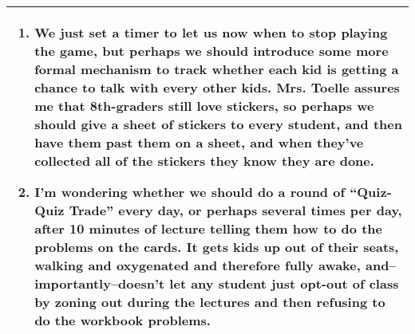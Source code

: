\begin{small}
\begin{tabularx}{\linewidth}{|X|}
{\begin{enumerate}
    \item We just set a timer to let us now when to stop playing the
      game, but perhaps we should introduce some more formal mechanism
      to track whether each kid is getting a chance to talk with every
      other kids.  Mrs. Toelle assures me that 8th-graders still love
      stickers, so perhaps we should give a sheet of stickers to every
      student, and then have them past them on a sheet, and when
      they've collected all of the stickers they know they are done.

    \item I'm wondering whether we should do a round of ``Quiz-Quiz
      Trade'' every day, or perhaps several times per day, after 10
      minutes of lecture telling them how to do the problems on the
      cards.  It gets kids up out of their seats, walking and
      oxygenated and therefore fully awake, and--importantly--doesn't
      let any student just opt-out of class by zoning out during the
      lectures and then refusing to do the workbook problems.

  \end{enumerate} }\\
  \hline
\end{tabularx}
\end{small}
